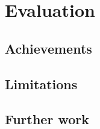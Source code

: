 
\section{Evaluation}
    \label{sec:evaluation}
\subsection{Achievements}
\subsection{Limitations}
\subsection{Further work}
